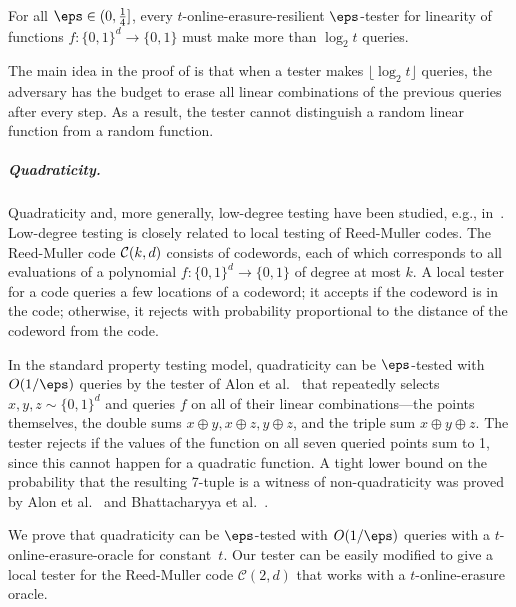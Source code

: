 \documentclass{toc}
\begin{document}
\begin{theorem}\label{thm:linearity_lower}
For all $\eps \in(0, \frac{1}{4}]$, every $t$-online-erasure-resilient $\eps$-tester for linearity of functions $f \colon \{0,1\}^d\to \{0,1\}$ must make more than $\log_2 t$ queries. %
\end{theorem}

The main idea in the proof of  is that when a tester makes $\lfloor\log_2 t\rfloor$ queries, the adversary has the budget to erase all linear combinations of the previous queries after every step. As a result, the tester cannot distinguish a random linear function from a random function.


\subparagraph*{Quadraticity.}
Quadraticity and, more generally, low-degree testing have been studied, e.g.,
in~\cite{BabaiFL91,BabaiFLS91,GemmellLRSW91,FeigeGLSS96,FriedlS95,RubinfeldS96, RazS97, AlonKKLR05, AroraS03, MoshkovitzR08, Moshkovitz17, KaufmanR06, Samorodnitsky07, SamorodnitskyT09, JutlaPRZ09, BKSSZ10,HaramatySS13, Ron-ZewiS13, DinurG13}. 
%
%
Low-degree testing is closely related to local testing of Reed-Muller codes. The %
Reed-Muller code ${\cal C}(k,d)$ 
consists of codewords, each of which corresponds to all evaluations of a  polynomial $f\colon \{0,1\}^d \to \{0,1\}$  of degree at most $k$. %
A local tester for a code queries a few locations of a codeword; it accepts if the codeword is in the code; otherwise, it rejects with probability proportional to the distance of the codeword from the code.


In the standard property testing model, quadraticity can be $\eps$-tested with $O(1/\eps)$ queries by the tester of Alon et al.~\cite{AlonKKLR05} that repeatedly selects $x,y,z\sim\{0,1\}^d$ and queries $f$ on all of their linear combinations---the points themselves, the double sums $x\oplus y,x\oplus z, y\oplus z$, and the triple sum $x\oplus y\oplus z$. The tester rejects if the values of the function on all seven queried points sum to 1, since this cannot happen for a quadratic function.
 A tight lower bound on the probability that the resulting 7-tuple is a witness of non-quadraticity was proved by  Alon et al.~\cite{AlonKKLR05}
 and Bhattacharyya et al.~\cite{BKSSZ10}.


We prove that quadraticity can be $\eps$-tested with $O(1/\eps)$ queries with a $t$-online-erasure-oracle for constant~$t$. 
Our tester can be easily modified to give a local tester for the Reed-Muller code $\mathcal{C}(2,d)$ that works with a $t$-online-erasure oracle.
%
\end{document}
